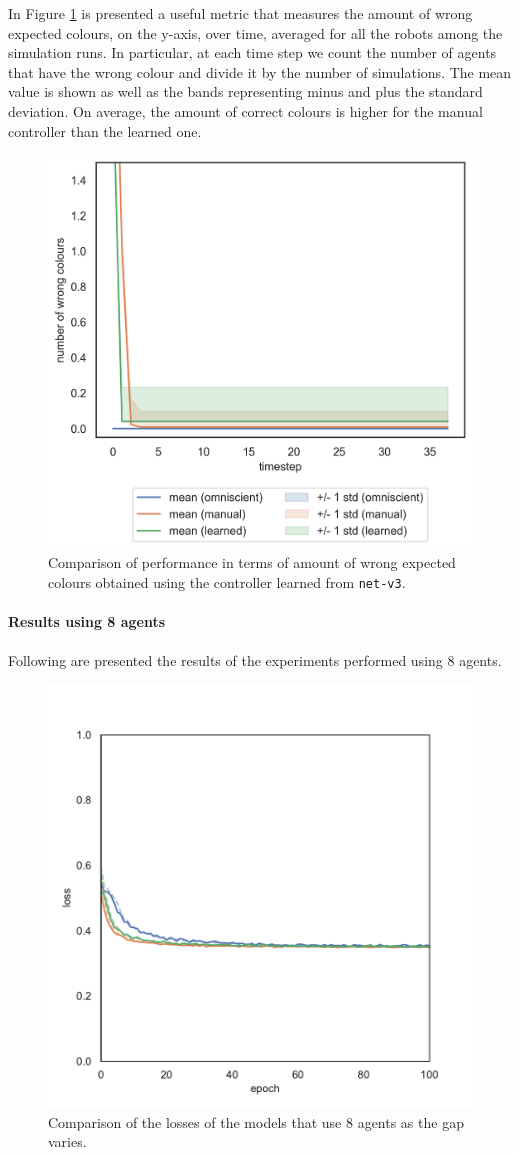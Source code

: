 In Figure \ref{fig:net-v3error} is presented a useful metric that measures the 
amount of wrong expected colours, on the y-axis, over time, averaged for all the 
robots among the simulation runs. In particular, at each time step we count the 
number of agents that have the wrong colour and divide it by the number of 
simulations.
The mean value is shown as well as the bands representing minus and plus the 
standard deviation.
On average, the amount of correct colours is higher for the manual controller 
than the learned one. 
\begin{figure}[!htb]
	\centering
	\includegraphics[width=.5\textwidth]{contents/images/net-v3/colours-errors-compressed}%
	\caption[Evaluation of \texttt{net-v3} amount of wrong expected 
	colours.]{Comparison of performance in terms of amount of wrong expected 
		colours obtained using the controller learned from \texttt{net-v3}.}
	\label{fig:net-v3error}
	\vspace{-0.5cm}
\end{figure}

\paragraph*{Results using 8 agents}
Following are presented the results of the experiments performed using $8$ 
agents. 
\begin{figure}[H]
	\centering
	\includegraphics[width=.5\textwidth]{contents/images/task2/loss-communication-N8}
	\caption[Comparison of the losses of the models that use $8$ 
	agents.]{Comparison of the losses of the models that use $8$ agents as 
	the gap varies.}
	\label{fig:commlossn8t2}
\end{figure}


